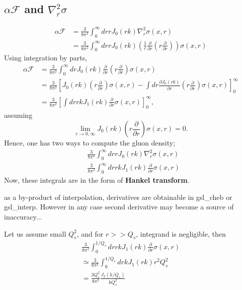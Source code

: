 \documentclass[12pt]{article}
\begin{document}
\subsection{$\alpha\mathcal{F}$ and $\nabla^2_r \sigma$}
\begin{equation}
\begin{split}
\alpha\mathcal{F}&=\frac{3}{8\pi^2}\int^\infty_0dr r J_0(r k)\nabla^2_r \sigma(x,r)\\
&=\frac{3}{8\pi^2}\int^\infty_0dr rJ_0(r k) \left(\frac{1}{r}\frac{\partial}{\partial r}\left(r\frac{\partial}{\partial r}\right)\right) \sigma(x,r)
\end{split}
\end{equation}
Using integration by parts,
\begin{equation}
\begin{split}
\alpha\mathcal{F}&=\frac{3}{8\pi^2}\int^\infty_0dr J_0(r k) \frac{\partial}{\partial r} \left(r\frac{\partial}{\partial r}\right) \sigma(x,r)\\
&=\frac{3}{8\pi^2}\left[ J_0(r k)\left(r\frac{\partial}{\partial r}\right) \sigma(x,r) - \int dr \frac{\partial J_0(r k)}{\partial r} \left(r\frac{\partial}{\partial r}\right) \sigma(x,r)\right]^\infty_0\\
&=\frac{3}{8\pi^2}\left[  \int dr r k J_1(r k)\frac{\partial}{\partial r}\sigma(x,r)\right]^\infty_0,
\end{split}
\end{equation}
assuming 
\begin{equation}
\lim_{r\rightarrow0,\infty}J_0(r k)\left(r\frac{\partial}{\partial r}\right) \sigma(x,r)=0.
\end{equation}
Hence, one has two ways to compute the gluon density;
\begin{align}
&\frac{3}{8\pi^2}\int^\infty_0dr r J_0(r k)\nabla^2_r \sigma(x,r)\\
&\frac{3}{8\pi^2}\int^\infty_0  dr r k J_1(r k)\frac{\partial}{\partial r}\sigma(x,r)
\end{align}
Now, these integrals are in the form of\textbf{ Hankel transform}.

as a by-product of interpolation, derivatives are obtainable in gsl\_cheb or gsl\_interp. However in any case second derivative may become a source of inaccuracy...


Let us assume small $Q_s^2$, and for $r>>Q_s$, integrand is negligible, then
\begin{equation}
\begin{split}
\frac{3}{8\pi^2}\int^{1/Q_s}_0  dr r k J_1(r k)\frac{\partial}{\partial r}\sigma(x,r)\\
\simeq \frac{3}{8\pi^2}\int^{1/Q_s}_0  dr  k J_1(r k) r^2 Q_s^2\\
=\frac{3Q_s^2}{8\pi^2} \frac{J_2(k/Q_s)}{k Q_s^2}  
\end{split}
\end{equation}
\end{document}
